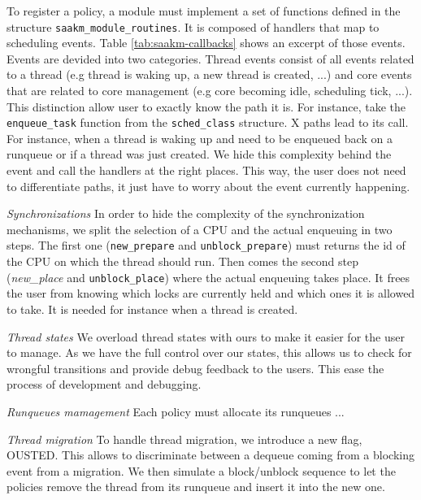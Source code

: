 \par To register a policy, a module must implement a set of functions defined in the structure \texttt{saakm\_module\_routines}. It is composed of handlers that map to scheduling events. Table \ref{tab:saakm-callbacks} shows an excerpt of those events. Events are devided into two categories. Thread events consist of all events related to a thread (e.g thread is waking up, a new thread is created, ...) and core events that are related to core management (e.g core becoming idle, scheduling tick, ...). This distinction allow user to exactly know the path it is. For instance, take the \texttt{enqueue\_task} function from the \texttt{sched\_class} structure. X  paths lead to its call. For instance, when a thread is waking up and need to be enqueued back on a runqueue or if a thread was just created. We hide this complexity behind the event and call the handlers at the right places. This way, the user does not need to differentiate paths, it just have to worry about the event currently happening.\newline
\par \textit{Synchronizations} In order to hide the complexity of the synchronization mechanisms, we split the selection of a CPU and the actual enqueuing in two steps. The first one (\texttt{new\_prepare} and \texttt{unblock\_prepare}) must returns the id of the CPU on which the thread should run. Then comes the second step (\textit{new\_place} and \texttt{unblock\_place}) where the actual enqueuing takes place. It frees the user from knowing which locks are currently held and which ones it is allowed to take. It is needed for instance when a thread is created.  \newline
\par \textit{Thread states} We overload thread states with ours to make it easier for the user to manage. As we have the full control over our states, this allows us to check for wrongful transitions and provide debug feedback to the users. This ease the process of development and debugging. \newline
\par \textit{Runqueues mamagement} Each policy must allocate its runqueues ...

\par \textit{Thread migration} To handle thread migration, we introduce a new flag, OUSTED. This allows to discriminate between a dequeue coming from a blocking event from a migration. We then simulate a block/unblock sequence to let the policies remove the thread from its runqueue and insert it into the new one.

